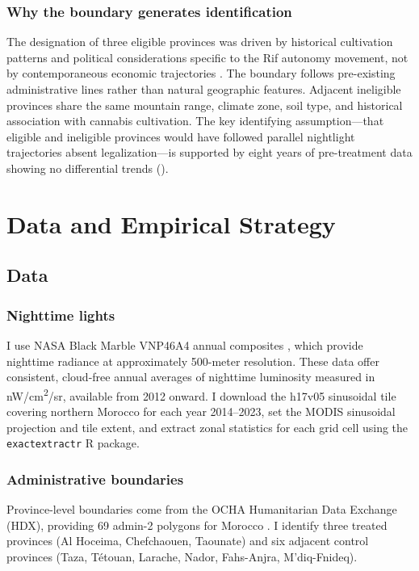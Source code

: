 \documentclass[12pt]{article}
\begin{document}
\subsubsection*{Why the boundary generates identification} The designation of three eligible provinces was driven by historical cultivation patterns and political considerations specific to the Rif autonomy movement, not by contemporaneous economic trajectories \citep{JIED2024}. The boundary follows pre-existing administrative lines rather than natural geographic features. Adjacent ineligible provinces share the same mountain range, climate zone, soil type, and historical association with cannabis cultivation. The key identifying assumption---that eligible and ineligible provinces would have followed parallel nightlight trajectories absent legalization---is supported by eight years of pre-treatment data showing no differential trends ().


\section{Data and Empirical Strategy}

\subsection{Data}

\subsubsection*{Nighttime lights} I use NASA Black Marble VNP46A4 annual composites \citep{Roman2018}, which provide nighttime radiance at approximately 500-meter resolution. These data offer consistent, cloud-free annual averages of nighttime luminosity measured in nW/cm\textsuperscript{2}/sr, available from 2012 onward. I download the h17v05 sinusoidal tile covering northern Morocco for each year 2014--2023, set the MODIS sinusoidal projection and tile extent, and extract zonal statistics for each grid cell using the \texttt{exactextractr} R package.

\subsubsection*{Administrative boundaries} Province-level boundaries come from the OCHA Humanitarian Data Exchange (HDX), providing 69 admin-2 polygons for Morocco \citep{HDX2024}. I identify three treated provinces (Al Hoceima, Chefchaouen, Taounate) and six adjacent control provinces (Taza, T\'{e}touan, Larache, Nador, Fahs-Anjra, M'diq-Fnideq).
\end{document}

